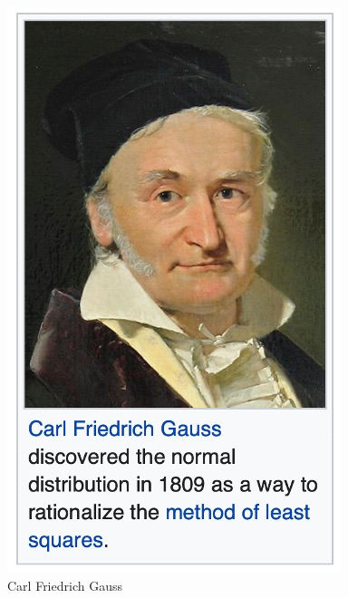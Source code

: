 \documentclass[
  12 pt,
  a4paper,
]{book}
\numberwithin{equation}{section}
\theoremstyle{plain}      %
\theoremstyle{definition} %
\theoremstyle{remark}     %
\theoremstyle{note}         %
\begin{document}
\begin{figure}[htbp]
    \begin{minipage}[t]{0.40\textwidth}
        \vspace{-38em} %
        \centering
        \includegraphics[width=\textwidth, height=0.3\textheight]{pictures/gauss.jpeg}
        \caption{Carl Friedrich Gauss}
        \vspace{1em} %

\end{minipage}
\end{figure}
\end{document}
